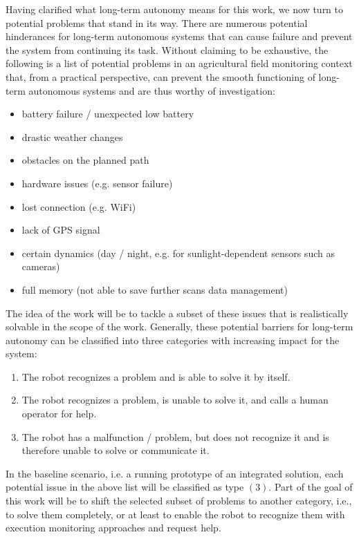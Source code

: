\documentclass[english, master, expose, utf8]{base/thesis_KBS}
\begin{document}
Having clarified what long-term autonomy means for this work, we now turn to potential problems that stand in its way.
There are numerous potential hinderances for long-term autonomous systems that can cause failure and prevent the system from continuing its task.
Without claiming to be exhaustive, the following is a list of potential problems in an agricultural field monitoring context that, from a practical perspective,
can prevent the smooth functioning of long-term autonomous systems and are thus worthy of investigation:
\begin{itemize}
    \item battery failure / unexpected low battery
    \item drastic weather changes
    \item obstacles on the planned path
    \item hardware issues (e.g. sensor failure)
    \item lost connection (e.g. WiFi)
    \item lack of GPS signal
    \item certain dynamics (day / night, e.g. for sunlight-dependent sensors such as cameras)
    \item full memory (not able to save further scans \textrightarrow data management)
\end{itemize}
The idea of the work will be to tackle a subset of these issues that is realistically solvable in the scope of the work.
Generally, these potential barriers for long-term autonomy can be classified into three categories with increasing impact for the system:
\begin{enumerate}
    \item The robot recognizes a problem and is able to solve it by itself.
    \item The robot recognizes a problem, is unable to solve it, and calls a human operator for help.
    \item The robot has a malfunction / problem, but does not recognize it and is therefore unable to solve or communicate it.
\end{enumerate}
In the baseline scenario, i.e. a running prototype of an integrated solution, each potential issue in the above list will be classified as type $(3)$.
Part of the goal of this work will be to shift the selected subset of problems to another category, i.e., to solve them completely, 
or at least to enable the robot to recognize them with execution monitoring approaches and request help.
\end{document}
